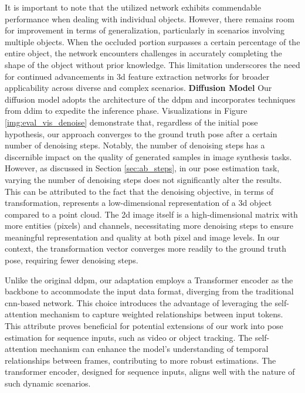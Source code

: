 \documentclass[12pt,DIV14,BCOR12mm,a4paper,footinclude=false,headinclude,parskip=half-,twoside,openright,cleardoublepage=empty,toc=index,bibliography=totoc,listof=totoc]{scrreprt}
\numberwithin{equation}{chapter}
\begin{document}
It is important to note that the utilized network exhibits commendable performance when dealing with individual objects. However, there remains room for improvement in terms of generalization, particularly in scenarios involving multiple objects. When the occluded portion surpasses a certain percentage of the entire object, the network encounters challenges in accurately completing the shape of the object without prior knowledge. This limitation underscores the need for continued advancements in \gls{3d} feature extraction networks for broader applicability across diverse and complex scenarios.
\bigbreak
\textbf{Diffusion Model} \quad Our diffusion model adopts the architecture of the \gls{ddpm} and incorporates techniques from \gls{ddim} to expedite the inference phase. Visualizations in Figure \ref{img:eval_vis_denoise} demonstrate that, regardless of the initial pose hypothesis, our approach converges to the ground truth pose after a certain number of denoising steps. Notably, the number of denoising steps has a discernible impact on the quality of generated samples in image synthesis tasks. However, as discussed in Section \ref{sec:ab_steps}, in our pose estimation task, varying the number of denoising steps does not significantly alter the results. This can be attributed to the fact that the denoising objective, in terms of transformation, represents a low-dimensional representation of a \gls{3d} object compared to a point cloud. The \gls{2d} image itself is a high-dimensional matrix with more entities (pixels) and channels, necessitating more denoising steps to ensure meaningful representation and quality at both pixel and image levels. In our context, the transformation vector converges more readily to the ground truth pose, requiring fewer denoising steps.

Unlike the original \gls{ddpm}, our adaptation employs a Transformer encoder as the backbone to accommodate the input data format, diverging from the traditional \gls{cnn}-based network. This choice introduces the advantage of leveraging the self-attention mechanism to capture weighted relationships between input tokens. This attribute proves beneficial for potential extensions of our work into pose estimation for sequence inputs, such as video or object tracking. The self-attention mechanism can enhance the model's understanding of temporal relationships between frames, contributing to more robust estimations. The transformer encoder, designed for sequence inputs, aligns well with the nature of such dynamic scenarios.
\end{document}
